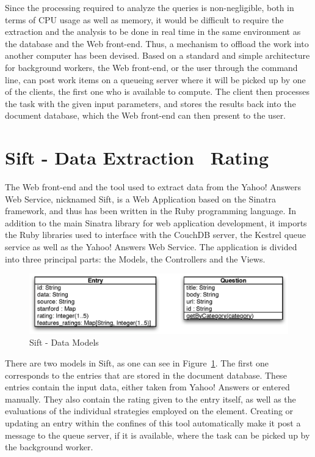 Since the processing required to analyze the queries is non-negligible, both in terms of CPU usage as well as memory, it would be difficult to require the extraction and the analysis to be done in real time in the same environment as the database and the Web front-end. Thus, a mechanism to offload the work into another computer has been devised. Based on a standard and simple architecture for background workers, the Web front-end, or the user through the command line, can post work items on a queueing server where it will be picked up by one of the clients, the first one who is available to compute. The client then processes the task with the given input parameters, and stores the results back into the document database, which the Web front-end can then present to the user.


\section{Sift - Data Extraction \amper\ Rating} %
\label{sec:sift_data_extraction_and_rating}

The Web front-end and the tool used to extract data from the Yahoo! Answers Web Service, nicknamed Sift, is a Web Application based on the Sinatra framework, and thus has been written in the Ruby programming language. In addition to the main Sinatra library for web application development, it imports the Ruby libraries used to interface with the CouchDB server, the Kestrel queue service as well as the Yahoo! Answers Web Service. The application is divided into three principal parts: the Models, the Controllers and the Views.

\begin{figure}[ht!]
  \begin{center}
    \includegraphics[width=\linewidth]{images/siftdatamodels}
  \end{center}
  \caption{Sift - Data Models}\label{fig:sift_data_models}
\end{figure}

There are two models in Sift, as one can see in Figure~\ref{fig:sift_data_models}. The first one corresponds to the entries that are stored in the document database. These entries contain the input data, either taken from Yahoo! Answers or entered manually. They also contain the rating given to the entry itself, as well as the evaluations of the individual strategies employed on the element. Creating or updating an entry within the confines of this tool automatically make it post a message to the queue server, if it is available, where the task can be picked up by the background worker.

